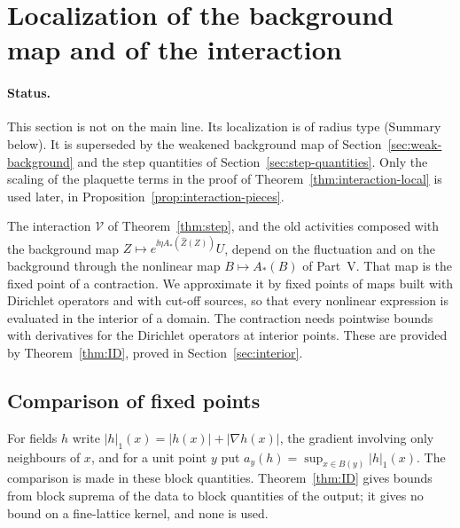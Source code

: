 \section{Localization of the background map and of the interaction}\label{sec:interaction-local}

\paragraph{Status.} This section is not on the main line. Its localization is of radius type (Summary below). It is superseded by the weakened background map of Section~\ref{sec:weak-background} and the step quantities of Section~\ref{sec:step-quantities}. Only the scaling of the plaquette terms in the proof of Theorem~\ref{thm:interaction-local} is used later, in Proposition~\ref{prop:interaction-pieces}.

The interaction $\mathcal V$ of Theorem~\ref{thm:step}, and the old activities composed with the background map $Z\mapsto e^{\ii\eta A_*(\hat Z(Z))}U$, depend on the fluctuation and on the background through the nonlinear map $B\mapsto A_*(B)$ of Part~V. That map is the fixed point of a contraction. We approximate it by fixed points of maps built with Dirichlet operators and with cut-off sources, so that every nonlinear expression is evaluated in the interior of a domain. The contraction needs pointwise bounds with derivatives for the Dirichlet operators at interior points. These are provided by Theorem~\ref{thm:ID}, proved in Section~\ref{sec:interior}.

\subsection{Comparison of fixed points}

For fields $h$ write $|h|_{1}(x)=|h(x)|+|\nabla h(x)|$, the gradient involving only neighbours of $x$, and for a unit point $y$ put $a_y(h)=\sup_{x\in B(y)}|h|_1(x)$. The comparison is made in these block quantities. Theorem~\ref{thm:ID} gives bounds from block suprema of the data to block quantities of the output; it gives no bound on a fine-lattice kernel, and none is used.

